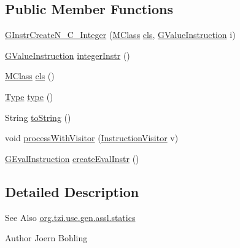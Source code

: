 \subsection*{Public Member Functions}
\begin{DoxyCompactItemize}
\item 
\hyperlink{classorg_1_1tzi_1_1use_1_1gen_1_1assl_1_1statics_1_1_g_instr_create_n___c___integer_ad1cccf0cb362044ee8dac96d4a201200}{G\-Instr\-Create\-N\-\_\-\-C\-\_\-\-Integer} (\hyperlink{interfaceorg_1_1tzi_1_1use_1_1uml_1_1mm_1_1_m_class}{M\-Class} \hyperlink{classorg_1_1tzi_1_1use_1_1gen_1_1assl_1_1statics_1_1_g_instr_create_n___c___integer_a65575196409f18dfd8c1055312bf6328}{cls}, \hyperlink{interfaceorg_1_1tzi_1_1use_1_1gen_1_1assl_1_1statics_1_1_g_value_instruction}{G\-Value\-Instruction} i)
\item 
\hyperlink{interfaceorg_1_1tzi_1_1use_1_1gen_1_1assl_1_1statics_1_1_g_value_instruction}{G\-Value\-Instruction} \hyperlink{classorg_1_1tzi_1_1use_1_1gen_1_1assl_1_1statics_1_1_g_instr_create_n___c___integer_aa5c857b185c37f9b1bd32673474e7fc5}{integer\-Instr} ()
\item 
\hyperlink{interfaceorg_1_1tzi_1_1use_1_1uml_1_1mm_1_1_m_class}{M\-Class} \hyperlink{classorg_1_1tzi_1_1use_1_1gen_1_1assl_1_1statics_1_1_g_instr_create_n___c___integer_a65575196409f18dfd8c1055312bf6328}{cls} ()
\item 
\hyperlink{interfaceorg_1_1tzi_1_1use_1_1uml_1_1ocl_1_1type_1_1_type}{Type} \hyperlink{classorg_1_1tzi_1_1use_1_1gen_1_1assl_1_1statics_1_1_g_instr_create_n___c___integer_a05e6b8f1e8596c93a12b6dddf794d844}{type} ()
\item 
String \hyperlink{classorg_1_1tzi_1_1use_1_1gen_1_1assl_1_1statics_1_1_g_instr_create_n___c___integer_a2cea559b8b973da49afcfe02dcdb51d7}{to\-String} ()
\item 
void \hyperlink{classorg_1_1tzi_1_1use_1_1gen_1_1assl_1_1statics_1_1_g_instr_create_n___c___integer_a13bd509f1f0b4f91559096bdb8ef32ac}{process\-With\-Visitor} (\hyperlink{interfaceorg_1_1tzi_1_1use_1_1gen_1_1assl_1_1statics_1_1_instruction_visitor}{Instruction\-Visitor} v)
\item 
\hyperlink{classorg_1_1tzi_1_1use_1_1gen_1_1assl_1_1dynamics_1_1_g_eval_instruction}{G\-Eval\-Instruction} \hyperlink{classorg_1_1tzi_1_1use_1_1gen_1_1assl_1_1statics_1_1_g_instr_create_n___c___integer_a9a448a0fc9f825ab27ea75669ce359d7}{create\-Eval\-Instr} ()
\end{DoxyCompactItemize}


\subsection{Detailed Description}
\begin{DoxySeeAlso}{See Also}
\hyperlink{namespaceorg_1_1tzi_1_1use_1_1gen_1_1assl_1_1statics}{org.\-tzi.\-use.\-gen.\-assl.\-statics} 
\end{DoxySeeAlso}
\begin{DoxyAuthor}{Author}
Joern Bohling 
\end{DoxyAuthor}


